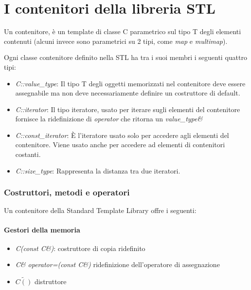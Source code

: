 \chapter{I contenitori della libreria STL}

Un contenitore, è un template di classe C parametrico sul tipo T degli elementi contenuti (alcuni invece sono parametrici su 2 tipi, come \textit{map} e \textit{multimap}).

Ogni classe contenitore definito nella STL ha tra i suoi membri i seguenti quattro tipi:

\begin{itemize}
	\item \textit{C::value\_type}: Il tipo T degli oggetti memorizzati nel contenitore deve essere assegnabile ma non deve necessariamente definire un costruttore di default.
	\item \textit{C::iterator}: Il tipo iteratore, usato per iterare sugli elementi del contenitore fornisce la ridefinizione di \textit{operator\textasteriskcentered} che ritorna un \textit{value\_type\&}
	\item \textit{C::const\_iterator}: \`{E} l'iteratore usato solo per accedere agli elementi del contenitore. Viene usato anche per accedere ad elementi di contenitori costanti.
	\item \textit{C::size\_type}: Rappresenta la distanza tra due iteratori.
\end{itemize}

\subsection{Costruttori, metodi e operatori}

Un contenitore della Standard Template Library offre i seguenti:

\subsubsection{Gestori della memoria}
\begin{itemize}
	\item \textit{C(const C\&)}: costruttore di copia ridefinito
	\item \textit{C\& operator=(const C\&)} ridefinizione dell'operatore di assegnazione
	\item \textit{$ \tilde{C()} $} distruttore 
\end{itemize}

